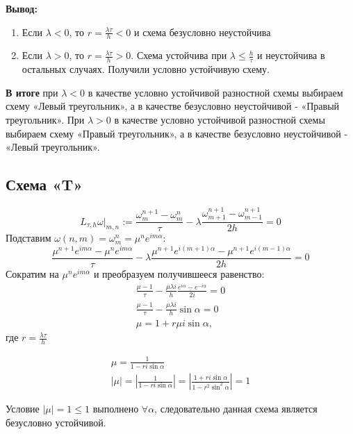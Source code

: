 \documentclass[titlepage]{article}
\def\l{\left}
\def\r{\right}
\def\le{\leqslant}
\begin{document}
\textbf{Вывод:} 
\begin{enumerate}
	\item Если $\lambda < 0$, то $r = \frac{\lambda\tau}{h} < 0$ и схема безусловно неустойчива
	\item Если $\lambda > 0$, то $r = \frac{\lambda\tau}{h} > 0$. Схема устойчива при $\lambda \le \frac{h}{\tau}$ и неустойчива в остальных случаях. Получили условно устойчивую схему.
\end{enumerate}
\hfill \break

\textbf{В итоге} при  $\lambda < 0$ в качестве условно устойчивой разностной схемы выбираем схему «Левый треугольник», а в качестве безусловно неустойчивой - «Правый треугольник». При  $\lambda > 0$ в качестве условно устойчивой разностной схемы выбираем схему «Правый треугольник», а в качестве безусловно неустойчивой - «Левый треугольник».

\subsection{Схема «T»}
\begin{equation*}
	L_{\tau,h}{\omega} |_{m,n} := \frac{\omega_m^{n+1} - \omega_m^n}{\tau} - \lambda\frac{\omega_{m+1}^{n+1} - \omega_{m-1}^{n+1}}{2h} = 0
\end{equation*}
Подставим $\omega(n,m) = \omega_m^n = \mu^ne^{im\alpha}$:
\begin{equation*}
	\frac{\mu^{n+1}e^{im\alpha} - \mu^ne^{im\alpha}}{\tau} - \lambda\frac{\mu^{n+1}e^{i(m+1)\alpha} - \mu^{n+1}e^{i(m-1)\alpha}}{2h} = 0
\end{equation*}
Сократим на $\mu^ne^{im\alpha}$ и преобразуем получившееся равенство:
\begin{gather*}
	\frac{\mu-1}{\tau} - \frac{\mu \lambda i}{h}\frac{e^{i\alpha} - e^{-i\alpha}}{2i} = 0 \\
	\frac{\mu - 1}{\tau} - \frac{\mu \lambda i}{h}\sin{\alpha} = 0 \\
	\mu = 1 + r \mu i \sin{\alpha},
\end{gather*}
где $r = \frac{\lambda \tau}{h}$


\begin{gather*}
	\mu = \frac{1}{1 - ri\sin{\alpha}} \\
	|\mu| = \l|\frac{1}{1 - ri\sin{\alpha}}\r| = \l|\frac{1 + ri\sin{\alpha}}{1 - r^2\sin^2{\alpha}}\r| = 1
\end{gather*}

Условие $|\mu| = 1 \le 1$ выполнено $\forall \alpha$, следовательно данная схема является безусловно устойчивой.
\end{document}
